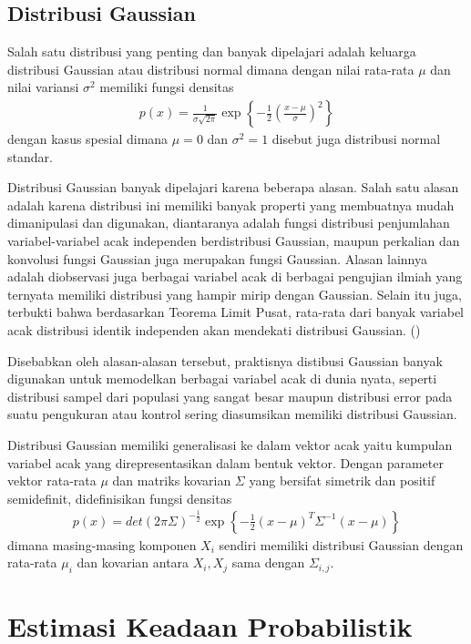 \subsection{Distribusi Gaussian}

Salah satu distribusi yang penting dan banyak dipelajari adalah keluarga distribusi Gaussian atau distribusi normal dimana dengan nilai rata-rata $\mu$ dan nilai variansi $\sigma^2$ memiliki fungsi densitas
\begin{align}
    p(x) = \frac{1}{\sigma \sqrt{2\pi}} \exp\left\{-\frac{1}{2}\left(\frac{x-\mu}{\sigma}\right)^2\right\}
\end{align}
dengan kasus spesial dimana $\mu = 0$ dan $\sigma^2 = 1$ disebut juga distribusi normal standar.

Distribusi Gaussian banyak dipelajari karena beberapa alasan. Salah satu alasan adalah karena distribusi ini memiliki banyak properti yang membuatnya mudah dimanipulasi dan digunakan, diantaranya adalah fungsi distribusi penjumlahan variabel-variabel acak independen berdistribusi Gaussian, maupun perkalian dan konvolusi fungsi Gaussian juga merupakan fungsi Gaussian. Alasan lainnya adalah diobservasi juga berbagai variabel acak di berbagai pengujian ilmiah yang ternyata memiliki distribusi yang hampir mirip dengan Gaussian. Selain itu juga, terbukti bahwa berdasarkan Teorema Limit Pusat, rata-rata dari banyak variabel acak distribusi identik independen akan mendekati distribusi Gaussian. (\cite{degroot2012})

Disebabkan oleh alasan-alasan tersebut, praktisnya distibusi Gaussian banyak digunakan untuk memodelkan berbagai variabel acak di dunia nyata, seperti distribusi sampel dari populasi yang sangat besar maupun distribusi error pada suatu pengukuran atau kontrol sering diasumsikan memiliki distribusi Gaussian.

Distribusi Gaussian memiliki generalisasi ke dalam vektor acak yaitu kumpulan variabel acak yang direpresentasikan dalam bentuk vektor. Dengan parameter vektor rata-rata $\mu$ dan matriks kovarian $\Sigma$ yang bersifat simetrik dan positif semidefinit, didefinisikan fungsi densitas
\begin{align}
    p(x) = det(2 \pi \Sigma)^{-\frac{1}{2}} \exp\left\{-\frac{1}{2}(x-\mu)^T \Sigma^{-1} (x-\mu)\right\}
\end{align}
dimana masing-masing komponen $X_i$ sendiri memiliki distribusi Gaussian dengan rata-rata $\mu_i$ dan kovarian antara $X_i, X_j$ sama dengan $\Sigma_{i,j}$.

\section{Estimasi Keadaan Probabilistik}

